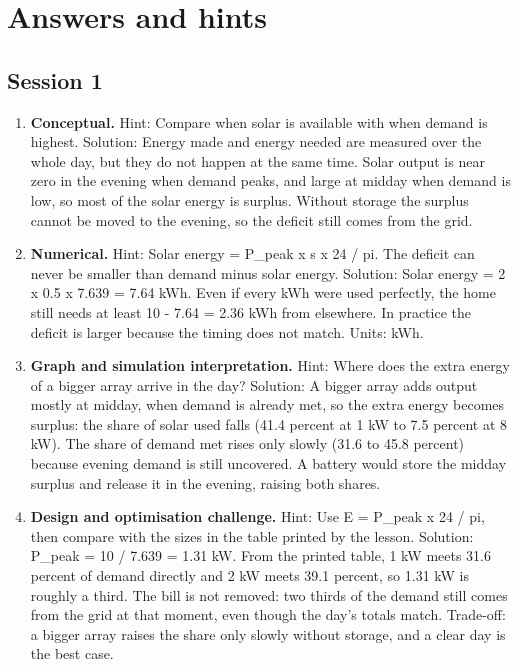 \documentclass[11pt,a4paper]{article}
\begin{document}
\section{Answers and hints}

\subsection*{Session 1}
\begin{enumerate}[nosep]
\item \textbf{Conceptual.} Hint: Compare when solar is available with when demand is highest. Solution: Energy made and energy needed are measured over the whole day, but they do not happen at the same time. Solar output is near zero in the evening when demand peaks, and large at midday when demand is low, so most of the solar energy is surplus. Without storage the surplus cannot be moved to the evening, so the deficit still comes from the grid.
\item \textbf{Numerical.} Hint: Solar energy = P\_peak x s x 24 / pi. The deficit can never be smaller than demand minus solar energy. Solution: Solar energy = 2 x 0.5 x 7.639 = 7.64 kWh. Even if every kWh were used perfectly, the home still needs at least 10 - 7.64 = 2.36 kWh from elsewhere. In practice the deficit is larger because the timing does not match. Units: kWh.
\item \textbf{Graph and simulation interpretation.} Hint: Where does the extra energy of a bigger array arrive in the day? Solution: A bigger array adds output mostly at midday, when demand is already met, so the extra energy becomes surplus: the share of solar used falls (41.4 percent at 1 kW to 7.5 percent at 8 kW). The share of demand met rises only slowly (31.6 to 45.8 percent) because evening demand is still uncovered. A battery would store the midday surplus and release it in the evening, raising both shares.
\item \textbf{Design and optimisation challenge.} Hint: Use E = P\_peak x 24 / pi, then compare with the sizes in the table printed by the lesson. Solution: P\_peak = 10 / 7.639 = 1.31 kW. From the printed table, 1 kW meets 31.6 percent of demand directly and 2 kW meets 39.1 percent, so 1.31 kW is roughly a third. The bill is not removed: two thirds of the demand still comes from the grid at that moment, even though the day's totals match. Trade-off: a bigger array raises the share only slowly without storage, and a clear day is the best case.
\end{enumerate}
\end{document}
